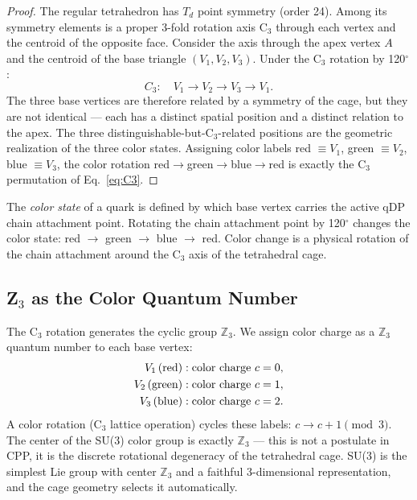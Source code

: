 \documentclass[12pt]{article}
\begin{document}
\begin{proof}
The regular tetrahedron has $T_d$ point symmetry (order 24).  Among
its symmetry elements is a proper 3-fold rotation axis C$_3$ through
each vertex and the centroid of the opposite face.  Consider the axis
through the apex vertex $A$ and the centroid of the base triangle
$(V_1, V_2, V_3)$.  Under the C$_3$ rotation by 120$^\circ$:
\begin{equation}
C_3:\quad V_1 \to V_2 \to V_3 \to V_1.
\label{eq:C3}
\end{equation}
The three base vertices are therefore related by a symmetry of the
cage, but they are not identical --- each has a distinct spatial
position and a distinct relation to the apex.  The three
distinguishable-but-C$_3$-related positions are the geometric
realization of the three color states.  Assigning color labels
red $\equiv V_1$, green $\equiv V_2$, blue $\equiv V_3$, the color
rotation red$\to$green$\to$blue$\to$red is exactly the C$_3$
permutation of Eq.~\eqref{eq:C3}.
\end{proof}

The \emph{color state} of a quark is defined by which base vertex
carries the active qDP chain attachment point.  Rotating the chain
attachment point by 120$^\circ$ changes the color state:
red $\to$ green $\to$ blue $\to$ red.  Color change is a physical
rotation of the chain attachment around the C$_3$ axis of the
tetrahedral cage.

\subsection{Z$_3$ as the Color Quantum Number}

The C$_3$ rotation generates the cyclic group $\mathbb{Z}_3$.  We
assign color charge as a $\mathbb{Z}_3$ quantum number to each base
vertex:
\begin{align}
V_1\,(\text{red})   &: \text{color charge } c = 0, \notag\\
V_2\,(\text{green}) &: \text{color charge } c = 1, \label{eq:Z3}\\
V_3\,(\text{blue})  &: \text{color charge } c = 2. \notag
\end{align}
A color rotation (C$_3$ lattice operation) cycles these labels:
$c \to c + 1 \pmod{3}$.  The center of the SU(3) color group is
exactly $\mathbb{Z}_3$ --- this is not a postulate in CPP, it is the
discrete rotational degeneracy of the tetrahedral cage.  SU(3) is
the simplest Lie group with center $\mathbb{Z}_3$ and a faithful
3-dimensional representation, and the cage geometry selects it
automatically.
\end{document}
